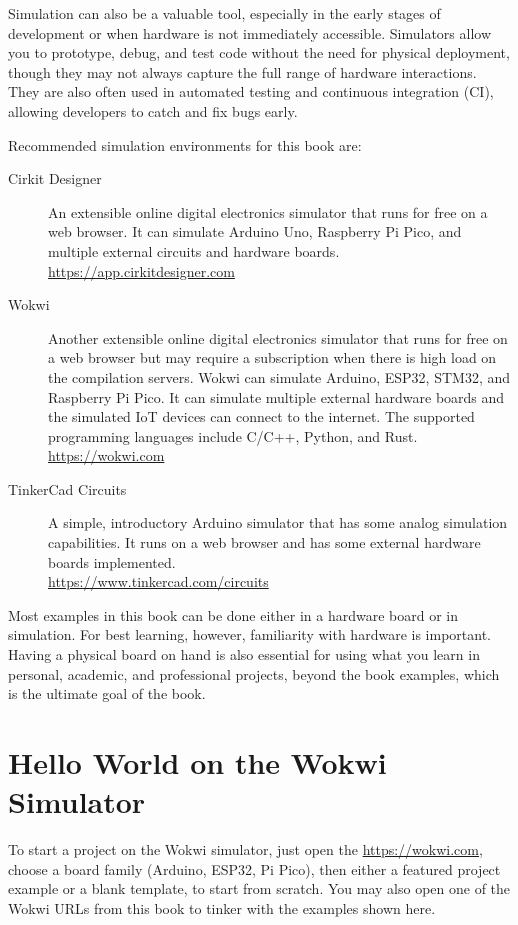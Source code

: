 Simulation can also be a valuable tool, especially in the early stages of development or when hardware is not immediately accessible.
Simulators allow you to prototype, debug, and test code without the need for physical deployment, though they may not always capture the full range of hardware interactions.
They are also often used in automated testing and continuous integration (CI), allowing developers to catch and fix bugs early.

Recommended simulation environments for this book are:
\begin{description}
\item[Cirkit Designer] 
  An extensible online digital electronics simulator that runs for free on a web browser.
  It can simulate Arduino Uno, Raspberry Pi Pico, and multiple external circuits and hardware boards.\\
  \url{https://app.cirkitdesigner.com}
\item[Wokwi] 
  Another extensible online digital electronics simulator that runs for free on a web browser but may require a subscription when there is high load on the compilation servers.
  Wokwi can simulate Arduino, ESP32, STM32, and Raspberry Pi Pico.
  It can simulate multiple external hardware boards and the simulated IoT devices can connect to the internet.
  The supported programming languages include C/C++, Python, and Rust.\\
  \url{https://wokwi.com}
\item[TinkerCad Circuits] 
  A simple, introductory Arduino simulator that has some analog simulation capabilities.
  It runs on a web browser and has some external hardware boards implemented.\\
  \url{https://www.tinkercad.com/circuits}
\end{description}

Most examples in this book can be done either in a hardware board or in simulation.
For best learning, however, familiarity with hardware is important.
Having a physical board on hand is also essential for using what you learn in personal, academic, and professional projects, beyond the book examples, which is the ultimate goal of the book.

\section{Hello World on the Wokwi Simulator}

To start a project on the Wokwi simulator, just open the \url{https://wokwi.com}, choose a board family (Arduino, ESP32, Pi Pico), then either a featured project example or a blank template, to start from scratch.
You may also open one of the Wokwi URLs from this book to tinker with the examples shown here.

